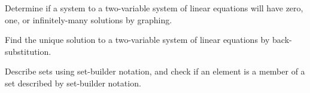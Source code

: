 \begin{readinessAssuranceOutcomes}
\item Determine if a system to a two-variable system of linear equations
      will have zero, one, or infinitely-many solutions by graphing.
\item Find the unique solution to a two-variable system of linear equations
      by back-substitution.
\item Describe sets using set-builder notation, and check if an element is a member of a set described by set-builder notation.
\end{readinessAssuranceOutcomes}

